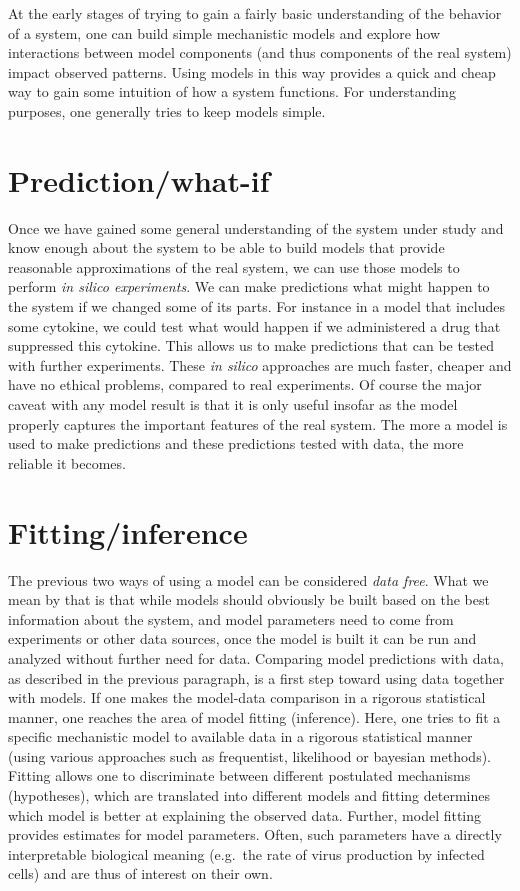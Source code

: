 \documentclass[]{book}
\theoremstyle{definition}
\theoremstyle{definition}
\theoremstyle{definition}
\theoremstyle{remark}
\begin{document}
At the early stages of trying to gain a fairly basic understanding of
the behavior of a system, one can build simple mechanistic models and
explore how interactions between model components (and thus components
of the real system) impact observed patterns. Using models in this way
provides a quick and cheap way to gain some intuition of how a system
functions. For understanding purposes, one generally tries to keep
models simple.

\hypertarget{predictionwhat-if}{%
\section{Prediction/what-if}\label{predictionwhat-if}}

Once we have gained some general understanding of the system under study
and know enough about the system to be able to build models that provide
reasonable approximations of the real system, we can use those models to
perform \emph{in silico experiments}. We can make predictions what might
happen to the system if we changed some of its parts. For instance in a
model that includes some cytokine, we could test what would happen if we
administered a drug that suppressed this cytokine. This allows us to
make predictions that can be tested with further experiments. These
\emph{in silico} approaches are much faster, cheaper and have no ethical
problems, compared to real experiments. Of course the major caveat with
any model result is that it is only useful insofar as the model properly
captures the important features of the real system. The more a model is
used to make predictions and these predictions tested with data, the
more reliable it becomes.

\hypertarget{fittinginference}{%
\section{Fitting/inference}\label{fittinginference}}

The previous two ways of using a model can be considered \emph{data
free}. What we mean by that is that while models should obviously be
built based on the best information about the system, and model
parameters need to come from experiments or other data sources, once the
model is built it can be run and analyzed without further need for data.
Comparing model predictions with data, as described in the previous
paragraph, is a first step toward using data together with models. If
one makes the model-data comparison in a rigorous statistical manner,
one reaches the area of model fitting (inference). Here, one tries to
fit a specific mechanistic model to available data in a rigorous
statistical manner (using various approaches such as frequentist,
likelihood or bayesian methods). Fitting allows one to discriminate
between different postulated mechanisms (hypotheses), which are
translated into different models and fitting determines which model is
better at explaining the observed data. Further, model fitting provides
estimates for model parameters. Often, such parameters have a directly
interpretable biological meaning (e.g.~the rate of virus production by
infected cells) and are thus of interest on their own.
\end{document}
